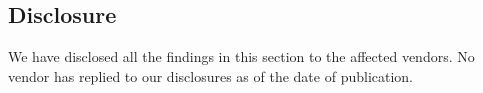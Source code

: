 \documentclass[sigconf,balance=false]{acmart}
\newcommand{\sumanth}[1]{\textcolor{violet}{\noindent[SR: #1]}}
\newcommand{\geoff}[1]{\textcolor{purple}{\noindent[GV: #1]}}
\newcommand{\sumanth}[1]{}
\newcommand{\geoff}[1]{}
\begin{document}



\subsection{Disclosure}
\label{sec:disclosure}

We have disclosed all the findings in this section to the affected
vendors. No vendor has replied to our disclosures as of the date of
publication.
\end{document}

